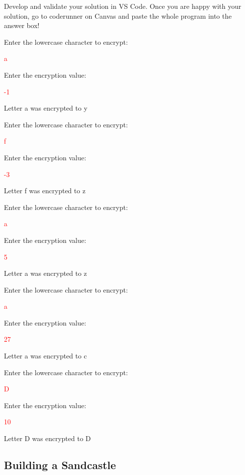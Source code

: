 Develop and validate your solution in VS Code. Once you are happy with your solution, go to coderunner on Canvas and paste the whole program into the answer box! 


\begin{sample}
Enter the lowercase character to encrypt:

\textcolor{red}{a}

Enter the encryption value:

\textcolor{red}{-1}

Letter a was encrypted to y
\end{sample}

\begin{sample}
Enter the lowercase character to encrypt:

\textcolor{red}{f}

Enter the encryption value:

\textcolor{red}{-3}

Letter f was encrypted to z
\end{sample}

\begin{sample}
Enter the lowercase character to encrypt:

\textcolor{red}{a}

Enter the encryption value:

\textcolor{red}{5}

Letter a was encrypted to z
\end{sample}

\begin{sample}
Enter the lowercase character to encrypt:

\textcolor{red}{a}

Enter the encryption value:

\textcolor{red}{27}

Letter a was encrypted to c
\end{sample}

\begin{sample}
Enter the lowercase character to encrypt:

\textcolor{red}{D}

Enter the encryption value:

\textcolor{red}{10}

Letter D was encrypted to D
\end{sample}



\subsection{Building a Sandcastle}

